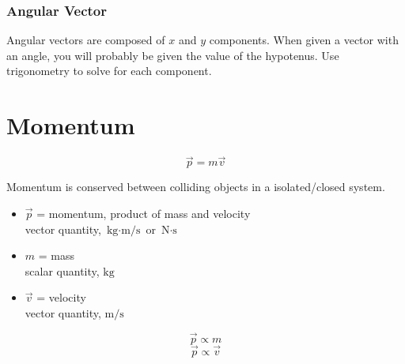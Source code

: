 \documentclass[a4paper,12pt]{article}
\begin{document}
\subsubsection{Angular Vector}
Angular vectors are composed of $x$ and $y$ components.
When given a vector with an angle, you will probably be given the value of the hypotenus.
Use trigonometry to solve for each component.

\pagebreak

\section{Momentum}
\Large $$\vec{p} = m\vec{v}$$ \normalsize

Momentum is conserved between colliding objects in a isolated/closed system.

\begin{itemize}
    \item{$\vec{p}$ = momentum, product of mass and velocity\\vector quantity, $\si{\kg\cdot\m\per\s}$ or $\si{\N\cdot\s}$}
    \item{$m$ = mass\\scalar quantity, $\si{\kg}$}
    \item{$\vec{v}$ = velocity\\vector quantity, $\si{\m\per\s}$}
\end{itemize}
\Large
$$\vec{p} \propto m$$
$$\vec{p} \propto \vec{v}$$
\normalsize
\end{document}
